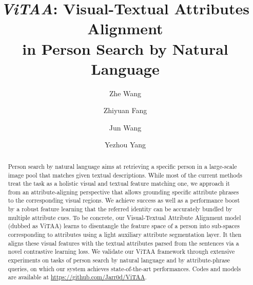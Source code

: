 \documentclass[runningheads]{llncs}
\makeatletter
\newcommand{\printfnsymbol}[1]{\textsuperscript{\@fnsymbol{#1}}}
\makeatother
\begin{document}
\pagestyle{headings}
\mainmatter
\def\ECCVSubNumber{1593}  

\title{\textit{ViTAA}: Visual-Textual Attributes Alignment\\ 
in Person Search by Natural Language} 

\begin{comment}
\titlerunning{ECCV-20 submission ID \ECCVSubNumber} 
\authorrunning{ECCV-20 submission ID \ECCVSubNumber} 
\author{Anonymous ECCV submission}
\institute{Paper ID \ECCVSubNumber}
\end{comment}


\author{Zhe Wang \and
Zhiyuan Fang \inst{2 \printfnsymbol{1}} \and
Jun Wang  \and 
Yezhou Yang }


    
\maketitle

\begin{abstract}
Person search by natural language aims at retrieving a specific person in a large-scale image pool that matches given textual descriptions. While most of the current methods treat the task as a holistic visual and textual feature matching one, we approach it from an attribute-aligning perspective that allows grounding specific attribute phrases to the corresponding visual regions.
We achieve success as well as a performance boost by a robust feature learning that the referred identity can be accurately bundled by multiple attribute cues. 
To be concrete, our Visual-Textual Attribute Alignment model (dubbed as {ViTAA}) learns to disentangle the feature space of a person into sub-spaces corresponding to attributes using a light auxiliary attribute segmentation layer. It then aligns these visual features with the textual attributes parsed from the sentences via a novel contrastive learning loss.
We validate our ViTAA framework through extensive experiments on tasks of person search by natural language and by attribute-phrase queries, on which our system achieves state-of-the-art performances. Codes and models are available at \url{https://github.com/Jarr0d/ViTAA}.

\end{abstract}
\end{document}
